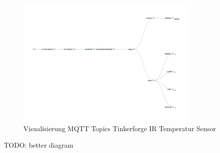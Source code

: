 \begin{figure}[H]
	\centering
		\includegraphics[width=0.8\textwidth]{bilder/TopicHierarchie_Bsp_Dualbutton.png}
	\caption{\label{fig:tempitTopics}Visualisierung MQTT Topics Tinkerforge IR Temperatur Sensor}
\end{figure}

TODO: better diagram
